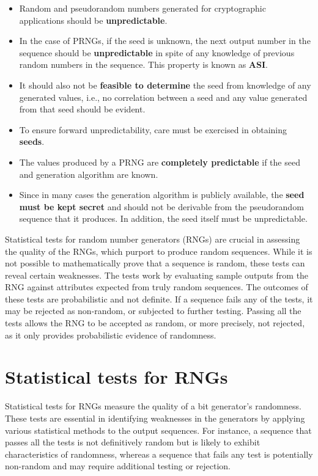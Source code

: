 \documentclass[12pt,openany]{book}
\theoremstyle{definition}
\begin{document}
\begin{itemize}
	\item Random and pseudorandom numbers generated for cryptographic applications should be \textbf{unpredictable}.
	\item In the case of PRNGs, if the seed is unknown, the next output number in the sequence should be \textbf{unpredictable} in spite of any knowledge of previous random numbers in the sequence. This property is known as \textbf{ASI}.
	\item It should also not be \textbf{feasible to determine} the seed from knowledge of any generated values, i.e., no correlation between a seed and any value generated from that seed should be evident.
	\item To ensure forward unpredictability, care must be exercised in obtaining \textbf{seeds}.
	\item The values produced by a PRNG are \textbf{completely predictable} if the seed and generation algorithm are known.
	\item Since in many cases the generation algorithm is publicly available, the \textbf{seed must be kept secret} and should not be derivable from the pseudorandom sequence that it produces. In addition, the seed itself must be unpredictable.
\end{itemize}







	
	\newpage
	Statistical tests for random number generators (RNGs) are crucial in assessing the quality of the RNGs, which purport to produce random sequences. While it is not possible to mathematically prove that a sequence is random, these tests can reveal certain weaknesses. The tests work by evaluating sample outputs from the RNG against attributes expected from truly random sequences. The outcomes of these tests are probabilistic and not definite. If a sequence fails any of the tests, it may be rejected as non-random, or subjected to further testing. Passing all the tests allows the RNG to be accepted as random, or more precisely, not rejected, as it only provides probabilistic evidence of randomness.
	
	\section{Statistical tests for RNGs}
	Statistical tests for RNGs measure the quality of a bit generator's randomness. These tests are essential in identifying weaknesses in the generators by applying various statistical methods to the output sequences. For instance, a sequence that passes all the tests is not definitively random but is likely to exhibit characteristics of randomness, whereas a sequence that fails any test is potentially non-random and may require additional testing or rejection.
	
\end{document}
